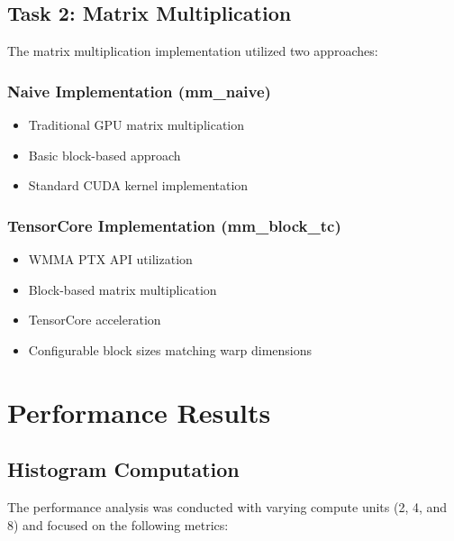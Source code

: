 \documentclass[9pt]{IEEEtran}
\begin{document}
\subsection*{Task 2: Matrix Multiplication}
The matrix multiplication implementation utilized two approaches:

\subsubsection*{Naive Implementation (mm\_naive)}
\begin{itemize}
    \item Traditional GPU matrix multiplication
    \item Basic block-based approach
    \item Standard CUDA kernel implementation
\end{itemize}

\subsubsection*{TensorCore Implementation (mm\_block\_tc)}
\begin{itemize}
    \item WMMA PTX API utilization
    \item Block-based matrix multiplication
    \item TensorCore acceleration
    \item Configurable block sizes matching warp dimensions
\end{itemize}

\section{Performance Results}

\subsection{Histogram Computation}
The performance analysis was conducted with varying compute units (2, 4, and 8) and focused on the following metrics:
\end{document}
